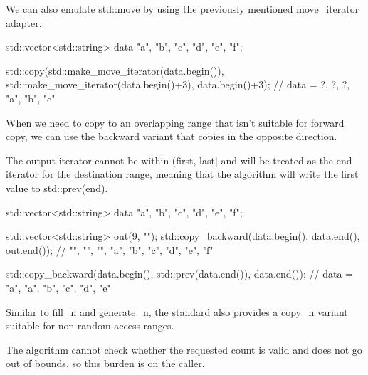 We can also emulate std::move by using the previously mentioned move\_iterator adapter.

\begin{box-note}
\begin{cppcode}
std::vector<std::string> data{ "a", "b", "c", "d", "e", "f"};

std::copy(std::make_move_iterator(data.begin()), std::make_move_iterator(data.begin()+3), 
          data.begin()+3);
// data = { ?, ?, ?, "a", "b", "c" }
\end{cppcode}
\end{box-note}

When we need to copy to an overlapping range that isn’t suitable for forward copy, we can use the backward variant that copies in the opposite direction.



The output iterator cannot be within (first, last] and will be treated as the end iterator for the destination range, meaning that the algorithm will write the first value to std::prev(end).

\begin{box-note}
\begin{cppcode}
std::vector<std::string> data{ "a", "b", "c", "d", "e", "f"};

std::vector<std::string> out(9, "");
std::copy_backward(data.begin(), data.end(), out.end());
// "", "", "", "a", "b", "c", "d", "e", "f"

std::copy_backward(data.begin(), std::prev(data.end()), data.end());
// data = { "a", "a", "b", "c", "d", "e" }
\end{cppcode}
\end{box-note}

Similar to fill\_n and generate\_n, the standard also provides a copy\_n variant suitable for non-random-access ranges.



The algorithm cannot check whether the requested count is valid and does not go out of bounds, so this burden is on the caller.


